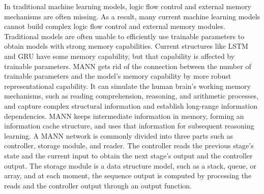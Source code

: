 
In traditional machine learning models, logic flow control and external memory mechanisms are often missing. As a result, many current machine learning models cannot build complex logic flow control and external memory modules. Traditional models are often unable to efficiently use trainable parameters to obtain models with strong memory capabilities. Current structures like LSTM and GRU have some memory capability, but that capability is affected by trainable parameters. MANN gets rid of the connection between the number of trainable parameters and the model's memory capability by more robust representational capability. It can simulate the human brain's working memory mechanisms, such as reading comprehension, reasoning, and arithmetic processes, and capture complex structural information and establish long-range information dependencies. MANN keeps intermediate information in memory, forming an information cache structure, and uses that information for subsequent reasoning learning. A MANN network is commonly divided into three parts such as controller, storage module, and reader. The controller reads the previous stage's state and the current input to obtain the next stage's output and the controller output. The storage module is a data structure model, such as a stack, queue, or array, and at each moment, the sequence output is computed by processing the reads and the controller output through an output function.

